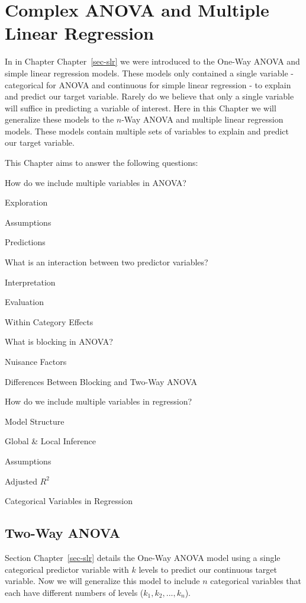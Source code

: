 \documentclass[
  letterpaper,
  DIV=11,
  numbers=noendperiod]{scrreprt}
\begin{document}

\hypertarget{sec-mlr}{%
\chapter{Complex ANOVA and Multiple Linear Regression}\label{sec-mlr}}

In in Chapter Chapter~\ref{sec-slr} we were introduced to the One-Way
ANOVA and simple linear regression models. These models only contained a
single variable - categorical for ANOVA and continuous for simple linear
regression - to explain and predict our target variable. Rarely do we
believe that only a single variable will suffice in predicting a
variable of interest. Here in this Chapter we will generalize these
models to the \(n\)-Way ANOVA and multiple linear regression models.
These models contain multiple sets of variables to explain and predict
our target variable.

This Chapter aims to answer the following questions:

How do we include multiple variables in ANOVA?

Exploration

Assumptions

Predictions

What is an interaction between two predictor variables?

Interpretation

Evaluation

Within Category Effects

What is blocking in ANOVA?

Nuisance Factors

Differences Between Blocking and Two-Way ANOVA

How do we include multiple variables in regression?

Model Structure

Global \& Local Inference

Assumptions

Adjusted \(R^2\)

Categorical Variables in Regression

\hypertarget{two-way-anova}{%
\section{Two-Way ANOVA}\label{two-way-anova}}

Section Chapter~\ref{sec-slr} details the One-Way ANOVA model using a
single categorical predictor variable with \(k\) levels to predict our
continuous target variable. Now we will generalize this model to include
\(n\) categorical variables that each have different numbers of levels
(\(k_1, k_2, ..., k_n\)).
\end{document}
